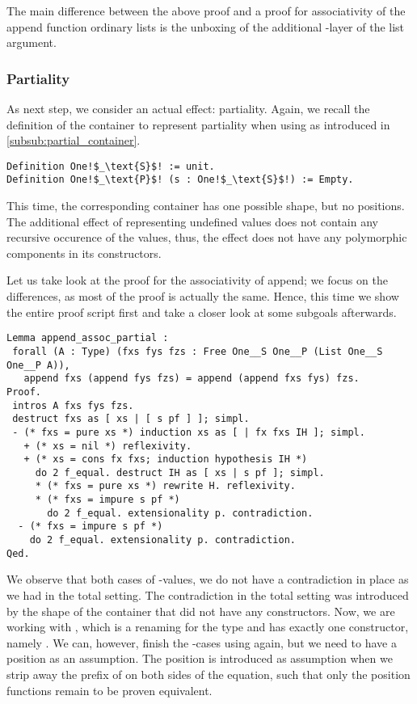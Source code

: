The main difference between the above proof and a proof for
associativity of the append function ordinary lists is the unboxing of
the additional -layer of the list argument.

\subsubsection{Partiality}
As next step, we consider an actual effect: partiality.
Again, we recall the definition of the container to represent partiality
when using  as introduced in
\autoref{subsub:partial_container}.

\begin{verbatim}
Definition One!$_\text{S}$! := unit.
Definition One!$_\text{P}$! (s : One!$_\text{S}$!) := Empty.
\end{verbatim}

This time, the corresponding container has one possible shape, but no
positions.
The additional effect of representing undefined values does not
contain any recursive occurence of the  values, thus, the
effect does not have any polymorphic components in its constructors.

Let us take look at the proof for the associativity of append; we
focus on the differences, as most of the proof is actually the same.
Hence, this time we show the entire proof script first and take a
closer look at some subgoals afterwards.

\begin{verbatim}
Lemma append_assoc_partial :
 forall (A : Type) (fxs fys fzs : Free One__S One__P (List One__S One__P A)),
   append fxs (append fys fzs) = append (append fxs fys) fzs.
Proof.
 intros A fxs fys fzs.
 destruct fxs as [ xs | [ s pf ] ]; simpl.
 - (* fxs = pure xs *) induction xs as [ | fx fxs IH ]; simpl.
   + (* xs = nil *) reflexivity.
   + (* xs = cons fx fxs; induction hypothesis IH *)
     do 2 f_equal. destruct IH as [ xs | s pf ]; simpl.
     * (* fxs = pure xs *) rewrite H. reflexivity.
     * (* fxs = impure s pf *)
       do 2 f_equal. extensionality p. contradiction.
  - (* fxs = impure s pf *)
    do 2 f_equal. extensionality p. contradiction.
Qed.
\end{verbatim}

We observe that both cases of -values, we do not have a
contradiction in place as we had in the total setting.
The contradiction in the total setting was introduced by the shape of
the container that did not have any constructors.
Now, we are working with , which is a renaming for the
 type and has exactly one constructor, namely .
We can, however, finish the -cases using
 again, but we need to have a position as an
assumption.
The position is introduced as assumption when we strip away the prefix
of  on both sides of the equation, such that
only the position functions  remain to be proven equivalent.

